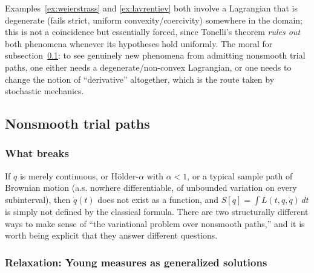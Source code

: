 Examples~\ref{ex:weierstrass} and \ref{ex:lavrentiev} both involve a Lagrangian
that is degenerate (fails strict, uniform convexity/coercivity) somewhere in
the domain; this is not a coincidence but essentially forced, since Tonelli's
theorem \emph{rules out} both phenomena whenever its hypotheses hold uniformly.
The moral for subsection~\ref{nonsmooth}: to see genuinely new phenomena from
admitting nonsmooth trial paths, one either needs a degenerate/non-convex
Lagrangian, or one needs to change the notion of ``derivative'' altogether,
which is the route taken by stochastic mechanics.

\subsection{Nonsmooth trial paths}
\label{nonsmooth}

\subsubsection{What breaks}

If $q$ is merely continuous, or H\"older-$\alpha$ with $\alpha<1$, or a typical
sample path of Brownian motion (a.s. nowhere differentiable, of unbounded
variation on every subinterval), then $\dot q(t)$ does not exist as a function,
and $S[q]=\int L(t,q,\dot q)\,dt$ is simply not defined by the classical
formula. There are two structurally different ways to make sense of ``the
variational problem over nonsmooth paths,'' and it is worth being explicit that
they answer different questions.

\subsubsection{Relaxation: Young measures as generalized solutions}

